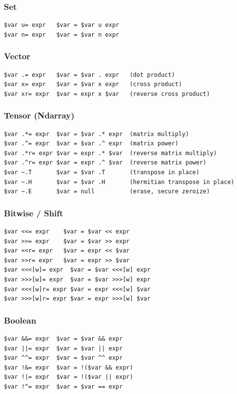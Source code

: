 \subsubsection{Set}
\begin{verbatim}
$var u= expr   $var = $var u expr
$var n= expr   $var = $var n expr
\end{verbatim}

\subsubsection{Vector}
\begin{verbatim}
$var .= expr   $var = $var . expr   (dot product)
$var x= expr   $var = $var x expr   (cross product)
$var xr= expr  $var = expr x $var   (reverse cross product)
\end{verbatim}

\subsubsection{Tensor (Ndarray)}
\begin{verbatim}
$var .*= expr  $var = $var .* expr  (matrix multiply)
$var .^= expr  $var = $var .^ expr  (matrix power)
$var .*r= expr $var = expr .* $var  (reverse matrix multiply)
$var .^r= expr $var = expr .^ $var  (reverse matrix power)
$var ~.T       $var = $var .T       (transpose in place)
$var ~.H       $var = $var .H       (hermitian transpose in place)
$var ~.E       $var = null          (erase, secure zeroize)
\end{verbatim}

\subsubsection{Bitwise / Shift}
\begin{verbatim}
$var <<= expr    $var = $var << expr
$var >>= expr    $var = $var >> expr
$var <<r= expr   $var = expr << $var
$var >>r= expr   $var = expr >> $var
$var <<<[w]= expr  $var = $var <<<[w] expr
$var >>>[w]= expr  $var = $var >>>[w] expr
$var <<<[w]r= expr $var = expr <<<[w] $var
$var >>>[w]r= expr $var = expr >>>[w] $var
\end{verbatim}

\subsubsection{Boolean}
\begin{verbatim}
$var &&= expr  $var = $var && expr
$var ||= expr  $var = $var || expr
$var ^^= expr  $var = $var ^^ expr
$var !&= expr  $var = !($var && expr)
$var !|= expr  $var = !($var || expr)
$var !^= expr  $var = $var == expr
\end{verbatim}

